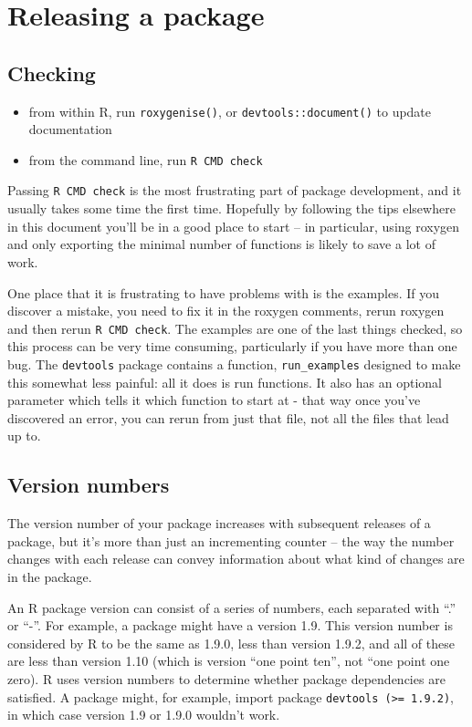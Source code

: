 \chapter{Releasing a package}

\section{Checking}

\begin{itemize}
\item
  from within R, run \texttt{roxygenise()}, or
  \texttt{devtools::document()} to update documentation
\item
  from the command line, run \texttt{R CMD check}
\end{itemize}

Passing \texttt{R CMD check} is the most frustrating part of package
development, and it usually takes some time the first time. Hopefully by
following the tips elsewhere in this document you'll be in a good place
to start -- in particular, using roxygen and only exporting the minimal
number of functions is likely to save a lot of work.

One place that it is frustrating to have problems with is the examples.
If you discover a mistake, you need to fix it in the roxygen comments,
rerun roxygen and then rerun \texttt{R CMD check}. The examples are one
of the last things checked, so this process can be very time consuming,
particularly if you have more than one bug. The \texttt{devtools}
package contains a function, \texttt{run\_examples} designed to make
this somewhat less painful: all it does is run functions. It also has an
optional parameter which tells it which function to start at - that way
once you've discovered an error, you can rerun from just that file, not
all the files that lead up to.

\section{Version numbers}

The version number of your package increases with subsequent releases of
a package, but it's more than just an incrementing counter -- the way
the number changes with each release can convey information about what
kind of changes are in the package.

An R package version can consist of a series of numbers, each separated
with ``.'' or ``-''. For example, a package might have a version 1.9.
This version number is considered by R to be the same as 1.9.0, less
than version 1.9.2, and all of these are less than version 1.10 (which
is version ``one point ten'', not ``one point one zero). R uses version
numbers to determine whether package dependencies are satisfied. A
package might, for example, import package
\texttt{devtools (\textgreater{}= 1.9.2)}, in which case version 1.9 or
1.9.0 wouldn't work.

